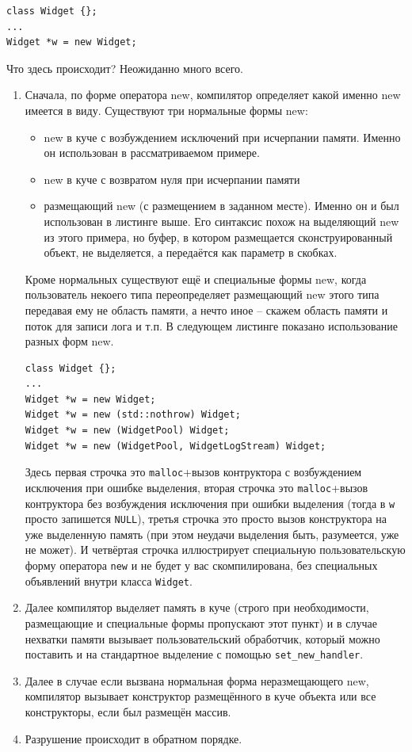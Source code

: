 \documentclass[a4paper,12pt,oneside]{article}
\begin{document}
\begin{lstlisting}
class Widget {};
...
Widget *w = new Widget;
\end{lstlisting}

Что здесь происходит? Неожиданно много всего.

\begin{enumerate}
\item
Сначала, по форме оператора new, компилятор определяет какой именно new имеется в виду. Существуют три нормальные формы new:
\begin{itemize}
\item
new в куче с возбуждением исключений при исчерпании памяти. Именно он использован в рассматриваемом примере.
\item
new в куче с возвратом нуля при исчерпании памяти
\item
размещающий new (с размещением в заданном месте). Именно он и был использован в листинге выше. Его синтаксис похож на выделяющий new из этого примера, но буфер, в котором размещается сконструированный объект, не выделяется, а передаётся как параметр в скобках.
\end{itemize}

Кроме нормальных существуют ещё и специальные формы new, когда пользователь некоего типа переопределяет размещающий new этого типа передавая ему не область памяти, а нечто иное -- скажем область памяти и поток для записи лога и т.п. В следующем листинге показано использование разных форм new.

\begin{lstlisting}
class Widget {};
...
Widget *w = new Widget;
Widget *w = new (std::nothrow) Widget;
Widget *w = new (WidgetPool) Widget;
Widget *w = new (WidgetPool, WidgetLogStream) Widget;
\end{lstlisting}

Здесь первая строчка это \lstinline!malloc!+вызов контруктора с возбуждением исключения при ошибке выделения, вторая строчка это \lstinline!malloc!+вызов контруктора без возбуждения исключения при ошибки выделения (тогда в \lstinline!w! просто запишется \lstinline!NULL!), третья строчка это просто вызов конструктора на уже выделенную память (при этом неудачи выделения быть, разумеется, уже не может). И четвёртая строчка иллюстрирует специальную пользовательскую форму оператора \lstinline!new! и не будет у вас скомпилирована, без специальных объявлений внутри класса \lstinline!Widget!.

\item
Далее компилятор выделяет память в куче (строго при необходимости, размещающие и специальные формы пропускают этот пункт) и в случае нехватки памяти вызывает пользовательский обработчик, который можно поставить и на стандартное выделение с помощью \lstinline!set_new_handler!.
\item
Далее в случае если вызвана нормальная форма неразмещающего new, компилятор вызывает конструктор размещённого в куче объекта или все конструкторы, если был размещён массив.
\item
Разрушение происходит в обратном порядке.
\end{enumerate}
\end{document}
